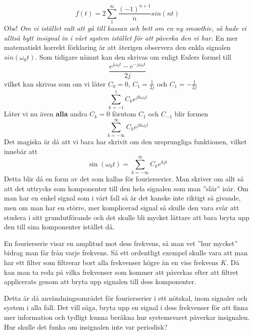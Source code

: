 \documentclass{article}
\begin{document}
\[f(t) = 2 \sum_{1}^{\infty} \frac{(-1)^{n+1}}{n} sin(n t) \]
Obs! \emph{Om vi istället valt att gå till kassan och bett om en ny smoothie, så hade vi alltså bytt insignal in i vårt system istället för att påverka den vi har.}
En mer matematiskt korrekt förklaring är att återigen observera den enkla signalen $sin(\omega_0 t)$. Som tidigare nämnt kan den skrivas om enligt Eulers formel till
\[ \frac{e^{j \omega_0 t} - e^{-j \omega_0 t}}{2j}\]
vilket kan skrivas som om vi låter $C_0=0$, $C_{1}=\frac{1}{2j}$ och $C_{1}=-\frac{1}{2j}$
\[ \sum_{k=-1}^1 C_k e^{j k \omega_0 t} \]
Låter vi nu även \textbf{alla} andra $C_k = 0$ förutom  $C_1$ och $C_{-1}$ blir formen
\[ \sum_{k=-\infty}^{\infty} C_k e^{j k \omega_0 t} \]
Det magiska är då att vi bara har skrivit om den ursprungliga funktionen, vilket innebär att 
\[ \sin(\omega_0 t) = \sum_{k=-\infty}^{\infty} C_k e^{k j t} \]
Detta blir då en form av det som kallas för fourierserier. Man skriver om allt så att det uttrycks som komponenter till den hela signalen som man ''slår'' isär. Om man har en enkel signal som i vårt fall så är det kanske inte riktigt så givande, men om man har en större, mer komplicerad signal så skulle den vara svår att studera i sitt grundutförande och det skulle bli mycket lättare att bara bryta upp den till sina komponenter istället då.

En fourierserie visar en amplitud mot dess frekvens, så man vet ''hur mycket'' bidrag man får från varje frekvens. Så ett ordentligt exempel skulle vara att man har ett filter som filtrerar bort alla frekvenser högre än en viss frekvens $K$. %
Då kan man ta reda på vilka frekvenser som kommer att påverkas efter att filtret applicerats genom att bryta upp signalen till dess komponenter. 

Detta är då användningsområdet för fourierserier i ett nötskal, inom signaler och system i alla fall. Det vill säga, bryta upp en signal i dess frekvenser för att finna mer information och tydligt kunna beräkna hur systemsvaret påverkar insignalen. Hur skulle det funka om insignalen inte var periodisk? 
\end{document}
